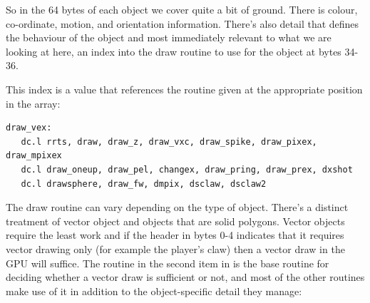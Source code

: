 So in the 64 bytes of each object we cover quite a bit of ground. There is colour, co-ordinate, motion, and orientation
information. There's also detail that defines the behaviour of the object and most immediately relevant to what
we are looking at here, an index into the draw routine to use for the object at bytes 34-36.

This index is a value that references the routine given at the appropriate position in the  array:
\begin{lstlisting}
draw_vex: 
   dc.l rrts, draw, draw_z, draw_vxc, draw_spike, draw_pixex, draw_mpixex
   dc.l draw_oneup, draw_pel, changex, draw_pring, draw_prex, dxshot
   dc.l drawsphere, draw_fw, dmpix, dsclaw, dsclaw2
\end{lstlisting}

The draw routine can vary depending on the type of object. There's a distinct treatment of vector object and objects
that are solid polygons. Vector objects require the least work and if the header in bytes 0-4 indicates that it requires
vector drawing only (for example the player's claw) then a vector draw in the GPU will suffice. The  routine
in the second item in  is the base routine for deciding whether a vector draw is sufficient or not, and
most of the other routines make use of it in addition to the object-specific detail they manage:

